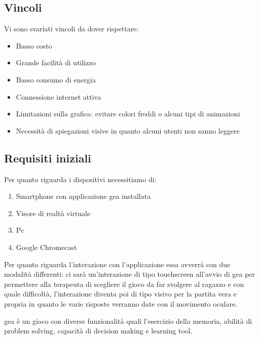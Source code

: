 \subsection{Vincoli} \label{subsec:vincoli}
Vi sono svariati vincoli da dover rispettare:
\begin{itemize}
\item Basso costo
\item Grande facilità di utilizzo
\item Basso consumo di energia
\item Connessione internet attiva
\item Limitazioni sulla grafica: evitare colori freddi o alcuni tipi di animazioni
\item Necessità di spiegazioni visive in quanto alcuni utenti non sanno leggere
\end{itemize}


\subsection{Requisiti iniziali} \label{subsec:requis}
Per quanto riguarda i dispositivi necessitiamo di:
\begin{enumerate}
\item Smartphone con applicazione \acs{gea} installata
\item Visore di realtà virtuale
\item Pc
\item Google Chromecast
\end{enumerate}

Per quanto riguarda l'interazione con l'applicazione essa avverrà con due modalità differenti: ci sarà un'interazione di tipo touchscreen all'avvio di \acs{gea} per permettere alla terapeuta di scegliere il gioco da far svolgere al ragazzo e con quale difficoltà, l'interazione diventa poi di tipo visivo per la partita vera e propria in quanto le varie risposte verranno date con il movimento oculare.


\acs{gea} è un gioco con diverse funzionalità quali l'esercizio della memoria, abilità di problem solving, capacità di decision making e learning tool.

